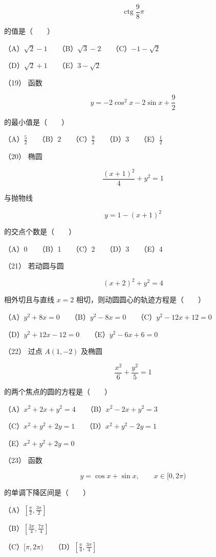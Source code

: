 \begin{question}
\nopagebreak[4]
\[
\operatorname{ctg}\frac98\pi
\]

的值是\mbox{（　　）}

（A）$\sqrt2-1$　　（B）$\sqrt3-2$　　（C）$-1-\sqrt2$

（D）$\sqrt2+1$　　（E）$3-\sqrt2$

（19） 函数

\nopagebreak[4]
\[
y=-2\cos^2x-2\sin x+\frac92
\]

的最小值是\mbox{（　　）}

（A）$\frac52$　　（B）$2$　　（C）$\frac92$　　（D）$3$　　（E）$\frac12$

（20） 椭圆

\nopagebreak[4]
\[
\frac{(x+1)^2}{4}+y^2=1
\]

与抛物线

\nopagebreak[4]
\[
y=1-(x+1)^2
\]

的交点个数是\mbox{（　　）}

（A）0　　（B）1　　（C）2　　（D）3　　（E）4

（21） 若动圆与圆

\nopagebreak[4]
\[
(x+2)^2+y^2=4
\]

相外切且与直线 $x=2$ 相切，则动圆圆心的轨迹方程是\mbox{（　　）}

（A）$y^2+8x=0$　　（B）$y^2-8x=0$　　（C）$y^2-12x+12=0$

（D）$y^2+12x-12=0$　　（E）$y^2-6x+6=0$

（22） 过点 $A(1,-2)$ 及椭圆

\nopagebreak[4]
\[
\frac{x^2}{6}+\frac{y^2}{5}=1
\]

的两个焦点的圆的方程是\mbox{（　　）}

（A）$x^2+2x+y^2=4$　　（B）$x^2-2x+y^2=3$

（C）$x^2+y^2+2y=1$　　（D）$x^2+y^2-2y=1$

（E）$x^2+y^2+2y=0$

（23） 函数

\nopagebreak[4]
\[
y=\cos x+\sin x,\qquad x\in[0,2\pi)
\]

的单调下降区间是\mbox{（　　）}

（A）$\left[\frac\pi2,\frac{3\pi}2\right]$

（B）$\left[\frac{3\pi}4,\frac{7\pi}4\right]$

（C）$[\pi,2\pi)$　　（D）$\left[\frac\pi4,\frac{3\pi}4\right]$


\end{question}
